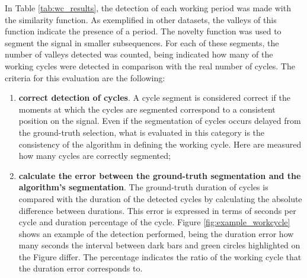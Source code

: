 In Table \ref{tab:wc_results}, the detection of each working period was made with the similarity function. As exemplified in other datasets, the valleys of this function indicate the presence of a period. The novelty function was used to segment the signal in smaller subsequences. For each of these segments, the number of valleys detected was counted, being indicated how many of the working cycles were detected in comparison with the real number of cycles. The criteria for this evaluation are the following:

\begin{enumerate}

\item \textbf{correct detection of cycles}. A cycle segment is considered correct if the moments at which the cycles are segmented correspond to a consistent position on the signal. Even if the segmentation of cycles occurs delayed from the ground-truth selection, what is evaluated in this category is the consistency of the algorithm in defining the working cycle. Here are measured how many cycles are correctly segmented;

\item \textbf{calculate the error between the ground-truth segmentation and the algorithm's segmentation}. The ground-truth duration of cycles is compared with the duration of the detected cycles by calculating the absolute difference between durations. This error is expressed in terms of seconds per cycle and duration percentage of the cycle. Figure \ref{fig:example_workcycle} shows an example of the detection performed, being the duration error how many seconds the interval between dark bars and green circles highlighted on the Figure differ. The percentage indicates the ratio of the working cycle that the duration error corresponds to. 

\end{enumerate}

